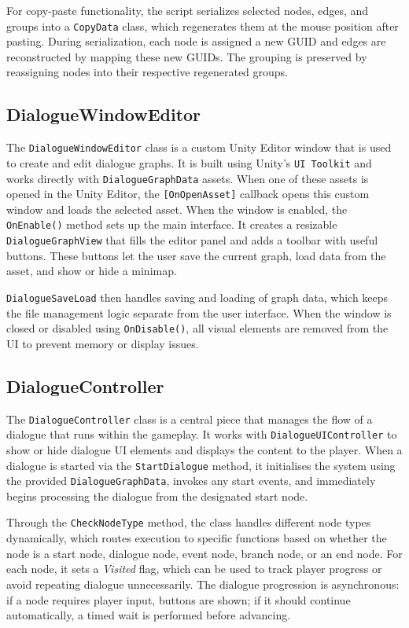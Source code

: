 For copy-paste functionality, the script serializes selected nodes, edges, and groups into a \verb|CopyData| class, which regenerates them at the mouse position after pasting. During serialization, each node is assigned a new GUID and edges are reconstructed by mapping these new GUIDs. The grouping is preserved by reassigning nodes into their respective regenerated groups.

 
\subsection{DialogueWindowEditor}
\label{devlog:DialogueWindowEditor}
The \verb|DialogueWindowEditor| class is a custom Unity Editor window that is used to create and edit dialogue graphs. It is built using Unity’s \verb|UI Toolkit| and works directly with \verb|DialogueGraphData| assets. When one of these assets is opened in the Unity Editor, the \verb|[OnOpenAsset]| callback opens this custom window and loads the selected asset. When the window is enabled, the \verb|OnEnable()| method sets up the main interface. It creates a resizable \verb|DialogueGraphView| that fills the editor panel and adds a toolbar with useful buttons. These buttons let the user save the current graph, load data from the asset, and show or hide a minimap.

\verb|DialogueSaveLoad| then handles saving and loading of graph data, which keeps the file management logic separate from the user interface. When the window is closed or disabled using \verb|OnDisable()|, all visual elements are removed from the UI to prevent memory or display issues.


\subsection{DialogueController}
\label{devlog:DialogueController}
The \verb|DialogueController| class is a central piece that manages the flow of a dialogue that runs within the gameplay. It works with \verb|DialogueUIController| to show or hide dialogue UI elements and displays the content to the player. When a dialogue is started via the \verb|StartDialogue| method, it initialises the system using the provided \verb|DialogueGraphData|, invokes any start events, and immediately begins processing the dialogue from the designated start node.

Through the \verb|CheckNodeType| method, the class handles different node types dynamically, which routes execution to specific functions based on whether the node is a start node, dialogue node, event node, branch node, or an end node. For each node, it sets a \textit{Visited} flag, which can be used to track player progress or avoid repeating dialogue unnecessarily. The dialogue progression is asynchronous: if a node requires player input, buttons are shown; if it should continue automatically, a timed wait is performed before advancing.

